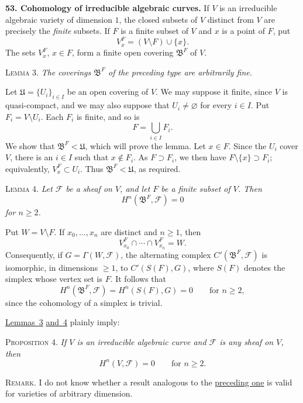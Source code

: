 
\medskip
{}\label{fac:III:1:no:53}
\textbf{53. Cohomology of irreducible algebraic curves.}
If $V$ is an irreducible algebraic variety of dimension $1$, the closed
subsets of $V$ distinct from $V$ are precisely the \textit{finite} subsets.
If $F$ is a finite subset of $V$ and $x$ is a point of $F$, put
\[
V_x^F=(V\setminus F)\cup\{x\}.
\]
The sets $V_x^F$, $x\in F$, form a finite open covering
\label{fac:III:1:no:53:cover:B-F}
$\mathfrak{B}^F$ of $V$.

\label{fac:III:1:lemma:3}
\textsc{Lemma 3.}
\textit{The coverings $\mathfrak{B}^F$ of the preceding type are
arbitrarily fine.}

Let $\mathfrak{U}=\{U_i\}_{i\in I}$ be an open covering of $V$. We may
suppose it finite, since $V$ is quasi-compact, and we may also suppose that
$U_i\neq\varnothing$ for every $i\in I$. Put $F_i=V\setminus U_i$. Each
$F_i$ is finite, and so is
\[
F=\bigcup_{i\in I}F_i.
\]
We show that $\mathfrak{B}^F<\mathfrak{U}$, which will prove the lemma. Let
$x\in F$. Since the $U_i$ cover $V$, there is an $i\in I$ such that
$x\notin F_i$. As $F\supset F_i$, we then have
$F\setminus\{x\}\supset F_i$; equivalently, $V_x^F\subset U_i$. Thus
$\mathfrak{B}^F<\mathfrak{U}$, as required.

\label{fac:III:1:lemma:4}
\textsc{Lemma 4.}
\textit{Let $\mathcal{F}$ be a sheaf on $V$, and let $F$ be a finite subset
of $V$. Then
\[
H^n(\mathfrak{B}^F,\mathcal{F})=0
\]
for $n\geq2$.}

Put $W=V\setminus F$. If $x_0,\ldots,x_n$ are distinct and $n\geq1$, then
\[
V_{x_0}^F\cap\cdots\cap V_{x_n}^F=W.
\]
Consequently, if $G=\Gamma(W,\mathcal{F})$, the alternating complex
$C'(\mathfrak{B}^F,\mathcal{F})$ is isomorphic, in dimensions $\geq1$, to
$C'(S(F),G)$, where $S(F)$ denotes the simplex whose vertex set is $F$.
It follows that
\label{fac:III:1:no:53:formula:simplex-cohomology}
\[
H^n(\mathfrak{B}^F,\mathcal{F})=H^n(S(F),G)=0
\qquad\text{for }n\geq2,
\]
since the cohomology of a simplex is trivial.

\hyperref[fac:III:1:lemma:3]{Lemmas~3} \hyperref[fac:III:1:lemma:4]{and~4} plainly imply:

\label{fac:III:1:prop:4}
\textsc{Proposition 4.}
\textit{If $V$ is an irreducible algebraic curve and $\mathcal{F}$ is any
sheaf on $V$, then
\[
H^n(V,\mathcal{F})=0\qquad\text{for }n\geq2.
\]}

\label{fac:III:1:no:53:remark}
\textsc{Remark.}
I do not know whether a result analogous to the \hyperref[fac:III:1:prop:4]{preceding one} is valid for
varieties of arbitrary dimension.

